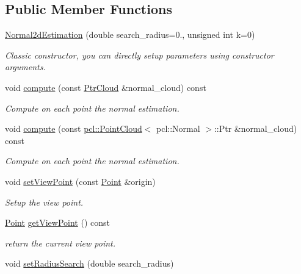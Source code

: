 \subsection*{Public Member Functions}
\begin{DoxyCompactItemize}
\item 
\hyperlink{classNormal2dEstimation_ac93035a8de2a45651571f7f6022f18b7}{Normal2d\+Estimation} (double search\+\_\+radius=0., unsigned int k=0)
\begin{DoxyCompactList}\small\item\em Classic constructor, you can directly setup parameters using constructor arguments. \end{DoxyCompactList}\item 
void \hyperlink{classNormal2dEstimation_a908d3a85cda5b29bb3ef119ab30d6ab6}{compute} (const \hyperlink{Normal2dEstimation_8h_a2894055ff89c63cbae90e22dfddaa610}{Ptr\+Cloud} \&normal\+\_\+cloud) const
\begin{DoxyCompactList}\small\item\em Compute on each point the normal estimation. \end{DoxyCompactList}\item 
void \hyperlink{classNormal2dEstimation_ac3fd17679a20a7f4faab72f58fdc6199}{compute} (const \hyperlink{test0426_8cc_a6c737bbce051bc4690e4c608adc2deec}{pcl\+::\+Point\+Cloud}$<$ pcl\+::\+Normal $>$\+::Ptr \&normal\+\_\+cloud) const
\begin{DoxyCompactList}\small\item\em Compute on each point the normal estimation. \end{DoxyCompactList}\item 
void \hyperlink{classNormal2dEstimation_ad05b65f35c4aa0b1511bf81e5a70b36d}{set\+View\+Point} (const \hyperlink{Normal2dEstimation_8h_ab8d898f36957cca40634530a6f118a3e}{Point} \&origin)
\begin{DoxyCompactList}\small\item\em Setup the view point. \end{DoxyCompactList}\item 
\hyperlink{Normal2dEstimation_8h_ab8d898f36957cca40634530a6f118a3e}{Point} \hyperlink{classNormal2dEstimation_a9a8b5ac0f03023a476f7986cf06c8f96}{get\+View\+Point} () const
\begin{DoxyCompactList}\small\item\em return the current view point. \end{DoxyCompactList}\item 
void \hyperlink{classNormal2dEstimation_aebdbc9d5d5cabd269522f42af9d1552f}{set\+Radius\+Search} (double search\+\_\+radius)

\end{DoxyCompactItemize}
